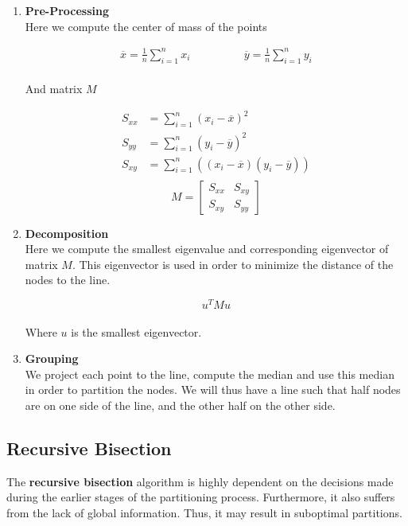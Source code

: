 \documentclass{article}
\begin{document}
\begin{enumerate}
	\item \textbf{Pre-Processing}
	\vspace{.2cm} \\
	Here we compute the center of mass of the points
	
	\begin{equation*}
 		\begin{split}
    		\overline{x} = \frac{1}{n} \sum^n_{i = 1}x_i
  		\end{split}
		\quad\quad\quad\quad
  		\begin{split}
    		\overline{y} = \frac{1}{n} \sum^n_{i = 1}y_i
  		\end{split}
	\end{equation*} \\
	And matrix $M$
	
	\begin{align*}
		S_{xx} &= \sum^n_{i=1} \left( x_i - \overline{x} \right)^2 \\
		S_{yy} &= \sum^n_{i=1} \left( y_i - \overline{y} \right)^2 \\
		S_{xy} &= \sum^n_{i=1} \left( (x_i - \overline{x}) (y_i - \overline{y}) \right) \\
	\end{align*}
	\[ M = \begin{bmatrix} S_{xx} & S_{xy} \\ S_{xy} & S_{yy} \end{bmatrix}	\]
	
	\item \textbf{Decomposition}
	\vspace{.2cm} \\
	Here we compute the smallest eigenvalue and corresponding eigenvector of matrix $M$. This eigenvector is used in order to minimize the distance of the nodes to the line.
	
	\[ u^T M u \] \\
	Where $u$ is the smallest eigenvector.
	
	\item \textbf{Grouping}
	\vspace{.2cm} \\
	We project each point to the line, compute the median and use this median in order to partition the nodes. We will thus have a line such that half nodes are on one side of the line, and the other half on the other side.
\end{enumerate}

\subsection{Recursive Bisection}
The \textbf{recursive bisection} algorithm is highly dependent on the decisions made during the earlier stages of the partitioning process. Furthermore, it also suffers from the lack of global information. Thus, it may result in suboptimal partitions.
\end{document}
